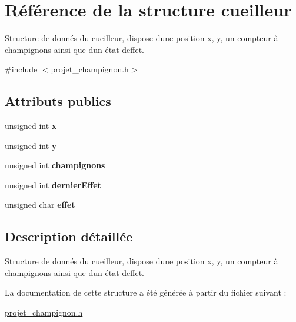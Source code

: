 \hypertarget{structcueilleur}{}\section{Référence de la structure cueilleur}
\label{structcueilleur}


Structure de donnés du cueilleur, dispose d\textquotesingle{}une position x, y, un compteur à champignons ainsi que d\textquotesingle{}un état d\textquotesingle{}effet.  




{\ttfamily \#include $<$projet\+\_\+champignon.\+h$>$}

\subsection*{Attributs publics}
\begin{DoxyCompactItemize}
\item 
\hypertarget{structcueilleur_ae40bcb8791899d49009c141d579b2331}{}\label{structcueilleur_ae40bcb8791899d49009c141d579b2331} 
unsigned int {\bfseries x}
\item 
\hypertarget{structcueilleur_a902fc5a0d6fe67b488331f2bc31f1e83}{}\label{structcueilleur_a902fc5a0d6fe67b488331f2bc31f1e83} 
unsigned int {\bfseries y}
\item 
\hypertarget{structcueilleur_a4d88163ea20f6b373d9c00c422994df6}{}\label{structcueilleur_a4d88163ea20f6b373d9c00c422994df6} 
unsigned int {\bfseries champignons}
\item 
\hypertarget{structcueilleur_a2bb2647b2d51cb636b9187a2b76e7a7f}{}\label{structcueilleur_a2bb2647b2d51cb636b9187a2b76e7a7f} 
unsigned int {\bfseries dernier\+Effet}
\item 
\hypertarget{structcueilleur_a01dc3c7d4d0ba7bf1fae36090db94e5e}{}\label{structcueilleur_a01dc3c7d4d0ba7bf1fae36090db94e5e} 
unsigned char {\bfseries effet}
\end{DoxyCompactItemize}


\subsection{Description détaillée}
Structure de donnés du cueilleur, dispose d\textquotesingle{}une position x, y, un compteur à champignons ainsi que d\textquotesingle{}un état d\textquotesingle{}effet. 

La documentation de cette structure a été générée à partir du fichier suivant \+:\begin{DoxyCompactItemize}
\item 
\hyperlink{projet__champignon_8h}{projet\+\_\+champignon.\+h}\end{DoxyCompactItemize}
